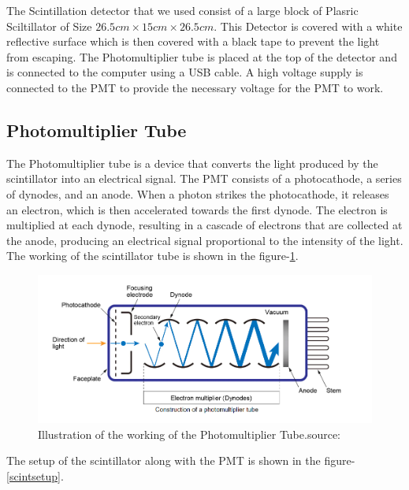 \documentclass{article}
\begin{document}
\begin{multicols}{2}
The Scintillation detector that we used consist of a large block of Plasric Sciltillator of Size $26.5cm \times 15cm \times 26.5cm$. This Detector is covered with a white reflective surface which is then covered with a black tape to prevent the light from escaping. The Photomultiplier tube is placed at the top of the detector and is connected to the computer using a USB cable. A high voltage supply is connected to the PMT to provide the necessary voltage for the PMT to work.

\subsection{Photomultiplier Tube}

The Photomultiplier tube is a device that converts the light produced by the scintillator into an electrical signal. The PMT consists of a photocathode, a series of dynodes, and an anode. When a photon strikes the photocathode, it releases an electron, which is then accelerated towards the first dynode. The electron is multiplied at each dynode, resulting in a cascade of electrons that are collected at the anode, producing an electrical signal proportional to the intensity of the light.
The working of the scintillator tube is shown in the figure-\ref{pmt}.
\begin{figure}[H]
    \centering
    \includegraphics[width = \columnwidth]{Images/pmtsetup.png}
    \caption{Illustration of the working of the Photomultiplier Tube.source:}
    \label{pmt}
\end{figure}

The setup of the scintillator along with the PMT is shown in the figure-\ref{scintsetup}.


\end{multicols}
\end{document}
